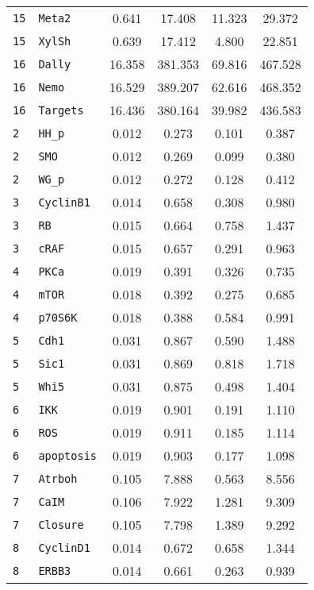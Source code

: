 \begin{longtable}{llcccc}
\texttt{15} & \texttt{Meta2} & 0.641 & 17.408 & 11.323 & 29.372 \\
\texttt{15} & \texttt{XylSh} & 0.639 & 17.412 & 4.800 & 22.851 \\
\texttt{16} & \texttt{Dally} & 16.358 & 381.353 & 69.816 & 467.528 \\
\texttt{16} & \texttt{Nemo} & 16.529 & 389.207 & 62.616 & 468.352 \\
\texttt{16} & \texttt{Targets} & 16.436 & 380.164 & 39.982 & 436.583 \\
\texttt{2} & \texttt{HH\_p} & 0.012 & 0.273 & 0.101 & 0.387 \\
\texttt{2} & \texttt{SMO} & 0.012 & 0.269 & 0.099 & 0.380 \\
\texttt{2} & \texttt{WG\_p} & 0.012 & 0.272 & 0.128 & 0.412 \\
\texttt{3} & \texttt{CyclinB1} & 0.014 & 0.658 & 0.308 & 0.980 \\
\texttt{3} & \texttt{RB} & 0.015 & 0.664 & 0.758 & 1.437 \\
\texttt{3} & \texttt{cRAF} & 0.015 & 0.657 & 0.291 & 0.963 \\
\texttt{4} & \texttt{PKCa} & 0.019 & 0.391 & 0.326 & 0.735 \\
\texttt{4} & \texttt{mTOR} & 0.018 & 0.392 & 0.275 & 0.685 \\
\texttt{4} & \texttt{p70S6K} & 0.018 & 0.388 & 0.584 & 0.991 \\
\texttt{5} & \texttt{Cdh1} & 0.031 & 0.867 & 0.590 & 1.488 \\
\texttt{5} & \texttt{Sic1} & 0.031 & 0.869 & 0.818 & 1.718 \\
\texttt{5} & \texttt{Whi5} & 0.031 & 0.875 & 0.498 & 1.404 \\
\texttt{6} & \texttt{IKK} & 0.019 & 0.901 & 0.191 & 1.110 \\
\texttt{6} & \texttt{ROS} & 0.019 & 0.911 & 0.185 & 1.114 \\
\texttt{6} & \texttt{apoptosis} & 0.019 & 0.903 & 0.177 & 1.098 \\
\texttt{7} & \texttt{Atrboh} & 0.105 & 7.888 & 0.563 & 8.556 \\
\texttt{7} & \texttt{CaIM} & 0.106 & 7.922 & 1.281 & 9.309 \\
\texttt{7} & \texttt{Closure} & 0.105 & 7.798 & 1.389 & 9.292 \\
\texttt{8} & \texttt{CyclinD1} & 0.014 & 0.672 & 0.658 & 1.344 \\
\texttt{8} & \texttt{ERBB3} & 0.014 & 0.661 & 0.263 & 0.939 \\

\end{longtable}
